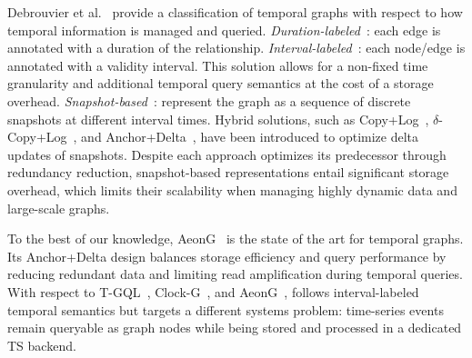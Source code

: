 Debrouvier et al.~\cite{DBLP:journals/vldb/DebrouvierPPSV21} provide a classification of temporal graphs with respect to how temporal information is managed and queried.
\textit{Duration-labeled}~\cite{DBLP:journals/tkde/WuCKHHW16}: each edge is annotated with a duration of the relationship.
\textit{Interval-labeled}~\cite{DBLP:journals/vldb/DebrouvierPPSV21}: each node/edge is annotated with a validity interval.
This solution allows for a non-fixed time granularity and additional temporal query semantics at the cost of a storage overhead.
\textit{Snapshot-based}~\cite{DBLP:journals/tkde/SemertzidisP19,DBLP:journals/tos/MiaoHLWYZPCC15,DBLP:journals/tlsdkcs/Massri0PM23,DBLP:journals/pvldb/HouZWLJWD24}: represent the graph as a sequence of discrete snapshots at different interval times.
%
Hybrid solutions, such as Copy+Log~\cite{DBLP:journals/tos/MiaoHLWYZPCC15}, $\delta$-Copy+Log~\cite{DBLP:journals/tlsdkcs/Massri0PM23}, and Anchor+Delta~\cite{DBLP:journals/pvldb/HouZWLJWD24}, have been introduced to optimize delta updates of snapshots.
%
Despite each approach optimizes its predecessor through redundancy reduction, snapshot-based representations entail significant storage overhead, which limits their scalability when managing highly dynamic data and large-scale graphs. 

To the best of our knowledge, AeonG~\cite{DBLP:journals/pvldb/HouZWLJWD24} is the state of the art for temporal graphs.
Its Anchor+Delta design balances storage efficiency and query performance by reducing redundant data and limiting read amplification during temporal queries.
With respect to T-GQL~\cite{DBLP:journals/vldb/DebrouvierPPSV21}, Clock-G~\cite{DBLP:journals/tlsdkcs/Massri0PM23}, and AeonG~\cite{DBLP:journals/pvldb/HouZWLJWD24}, \ourapproach follows interval-labeled temporal semantics but targets a different systems problem: time-series events remain queryable as graph nodes while being stored and processed in a dedicated TS backend.

